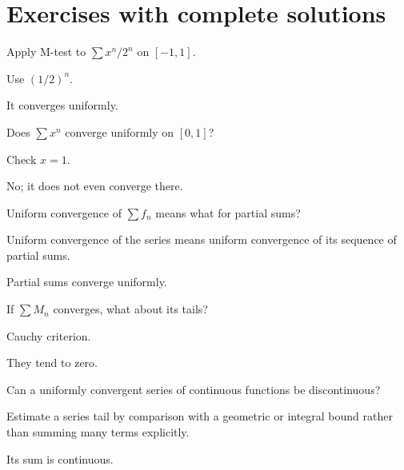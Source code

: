 \section{Exercises with complete solutions}

\begin{exercise}\label{exr:ii13-01}
Apply M-test to $\sum x^n/2^n$ on $[-1,1]$.
\end{exercise}
\begin{hint}
Use $(1/2)^n$.
\end{hint}
\begin{solution}
It converges uniformly.
\end{solution}

\begin{exercise}\label{exr:ii13-02}
Does $\sum x^n$ converge uniformly on $[0,1]$?
\end{exercise}
\begin{hint}
Check $x=1$.
\end{hint}
\begin{solution}
No; it does not even converge there.
\end{solution}

\begin{exercise}\label{exr:ii13-03}
Uniform convergence of $\sum f_n$ means what for partial sums?
\end{exercise}
\begin{hint}
Uniform convergence of the series means uniform convergence of its sequence of partial sums.
\end{hint}
\begin{solution}
Partial sums converge uniformly.
\end{solution}

\begin{exercise}\label{exr:ii13-04}
If $\sum M_n$ converges, what about its tails?
\end{exercise}
\begin{hint}
Cauchy criterion.
\end{hint}
\begin{solution}
They tend to zero.
\end{solution}

\begin{exercise}\label{exr:ii13-05}
Can a uniformly convergent series of continuous functions be discontinuous?
\end{exercise}
\begin{hint}
Estimate a series tail by comparison with a geometric or integral bound rather than summing many terms explicitly.
\end{hint}
\begin{solution}
Its sum is continuous.
\end{solution}

